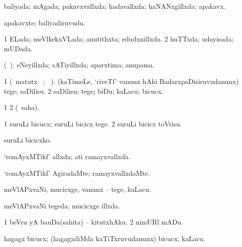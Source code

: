 {{\bentry
{} 
\gl{\gu}
\expl{}
\bmng
baliyada; mAgada; pakavxvallxda; hadavallxda; haNANxgillxda; apakavx. 
\emng
\eentry

\bentry
{} 
\gl{\nA}
\expl{}
\bmng
apakavxte; baliyadiruvudu. 
\emng
\eentry

\bentry
{} 
\gl{\gu}
\expl{}
\bmng
\bnum
\num{1} ELada; meVlkekxVLada; anutithxta; edudxnillxda. 
\num{2} huTTxda; udayisada; mUDada. 
\enum
\emng
\eentry

\bentry
{} 
\gl{\gu}
\expl{}
\bmng
(\ame\ ). eNeyillxda; sATiyillxda; aparxtima; anupama. 
\emng
\eentry

\bentry
{} 
\gl{\sakirx}
\expl{}
\bmng
\bnum
\num{1} (\BU\ matutx \BUkaq\ ; \vakaq\ ). (kaTimoLe, `riveTf' \mo vanunx hAki BadarxpaDisiruvudanunx) tege; saDilisu. 
\num{2} saDilisu; tege; biDu; kaLacu; bicucx. 
\enum
\emng
\eentry

\bentry
{} 
\gl{\sakirx}
\expl{}
\bmng
\bnum
\num{1}  
\num{2} (\akirx\ saha). 
\enum
\emng
\eentry

\bentry
{} 
\gl{\sakirx}
\expl{}
\bmng
\bnum
\num{1} suruLi bicucx; suruLi bicicx tege. 
\num{2} suruLi bicicx toVrisu. 
\enum
\emng

\noindent 
\gl{\akirx}
\expl{}
\bmng
suruLi bicicxko. 
\emng
\eentry

\bentry
{} 
\gl{\gu}
\expl{}
\bmng
`romAyxMTikf' allxda; ati ramayxvallxda. 
\emng
\eentry

\bentry
{} 
\gl{\kirxvi}
\expl{}
\bmng
`romAyxMTikf' AgiradaMte; ramayxvallxdaMte. 
\emng
\eentry

\bentry
{} 
\gl{\akirx}
\expl{}
\bmng
meVlAPxvaNi, mucicxge, \mo vanunx -- tege, kaLacu. 
\emng
\eentry

\bentry
{} 
\gl{\gu}
\expl{}
\bmng
meVlAPxvaNi tegeda; mucicxge illxda. 
\emng
\eentry

\bentry
{} 
\gl{\sakirx}
\expl{}
\bmng
\bnum
\num{1} beVru yA bauDa(sahita) -- kitutxhAku. 
\num{2} nimURl mADu. 
\enum
\emng
\eentry

\bentry
{} 
\gl{\akirx}
\expl{}
\bmng
hagagx bicucx; (hagagxdiMda kaTiTxruvudanunx) bicucx, kaLacu. 
\emng

}}
